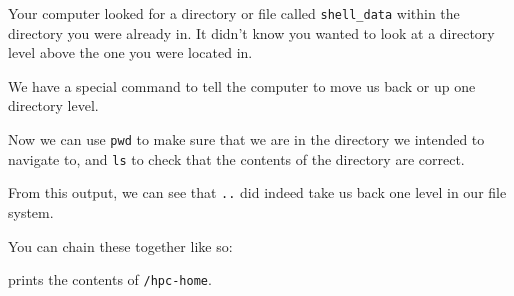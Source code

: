 \documentclass[
  letterpaper,
  DIV=11,
  numbers=noendperiod]{scrreprt}
\newenvironment{Shaded}{\begin{snugshade}}{\end{snugshade}}
\newcommand{\ExtensionTok}[1]{\textcolor[rgb]{0.00,0.23,0.31}{#1}}
\newcommand{\NormalTok}[1]{\textcolor[rgb]{0.00,0.23,0.31}{#1}}
\begin{document}
\begin{Shaded}
\end{Shaded}

Your computer looked for a directory or file called \texttt{shell\_data}
within the directory you were already in. It didn't know you wanted to
look at a directory level above the one you were located in.

We have a special command to tell the computer to move us back or up one
directory level.

\begin{Shaded}
\end{Shaded}

Now we can use \texttt{pwd} to make sure that we are in the directory we
intended to navigate to, and \texttt{ls} to check that the contents of
the directory are correct.

\begin{Shaded}
\end{Shaded}

\begin{Shaded}
\end{Shaded}

From this output, we can see that \texttt{..} did indeed take us back
one level in our file system.

You can chain these together like so:

\begin{Shaded}
\end{Shaded}

prints the contents of \texttt{/hpc-home}.
\end{document}
